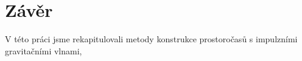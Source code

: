\chapter*{Závěr}

V této práci jsme rekapitulovali metody konstrukce prostoročasů s impulzními gravitačními vlnami,

